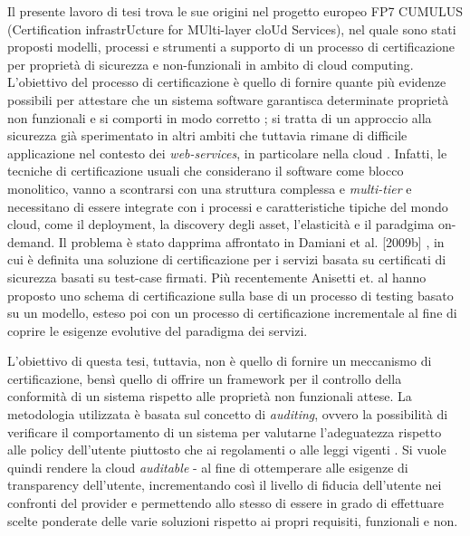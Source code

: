 \documentclass[../main.tex]{subfiles}
\begin{document}
Il presente lavoro di tesi trova le sue origini nel progetto europeo FP7 CUMULUS \cite{CumulusBigDoc} (Certification infrastrUcture for MUlti-layer cloUd Services), nel quale sono stati proposti modelli, processi e strumenti a supporto di un processo di certificazione per proprietà di sicurezza e non-funzionali in ambito di cloud computing.
L'obiettivo del processo di certificazione è quello di fornire quante più evidenze possibili per attestare che un sistema software garantisca determinate proprietà non funzionali e si comporti in modo corretto \cite{Ardagna:2015:SAC:2808687.2767005}; si tratta di un approccio alla sicurezza già sperimentato in altri ambiti che tuttavia rimane di difficile applicazione nel contesto dei \textit{web-services}, in particolare nella cloud \cite{Anisetti:2013:TSC:2460383.2460384}.
Infatti, le tecniche di certificazione usuali che considerano il software come blocco monolitico, vanno a scontrarsi con una struttura complessa e \textit{multi-tier} \cite{Anisetti:2013:TSC:2460383.2460384}
e necessitano di essere integrate con i processi e caratteristiche tipiche del mondo cloud, come il deployment, la discovery degli asset, l'elasticità e il paradgima on-demand.
Il problema è stato dapprima affrontato in Damiani et al. [2009b] \cite{5190685}, in cui è definita una soluzione di certificazione per i servizi basata su certificati di sicurezza basati su test-case firmati.
Più recentemente Anisetti et. al \cite{CertEvolutiva} \cite{CertSoa} \cite{6649614} hanno proposto uno schema di certificazione sulla base di un processo di testing basato su un modello, esteso poi con un processo di certificazione incrementale al fine di coprire le esigenze evolutive del paradigma dei servizi.

L'obiettivo di questa tesi, tuttavia, non è quello di fornire un meccanismo di certificazione, bensì quello di offrire un framework per il controllo della conformità di un sistema rispetto alle proprietà non funzionali attese.
La metodologia utilizzata è basata sul concetto di \textit{auditing}, ovvero la possibilità  di verificare il comportamento di un sistema per valutarne l'adeguatezza rispetto alle policy dell'utente piuttosto che ai regolamenti o alle leggi vigenti \cite{Ardagna:2015:SAC:2808687.2767005}.
Si vuole quindi rendere la cloud \textit{auditable} - al fine di ottemperare alle esigenze di transparency dell'utente, incrementando così il livello di fiducia dell'utente nei confronti del provider e permettendo allo stesso di essere in grado di effettuare scelte ponderate delle varie soluzioni rispetto ai propri requisiti, funzionali e non.
\end{document}
